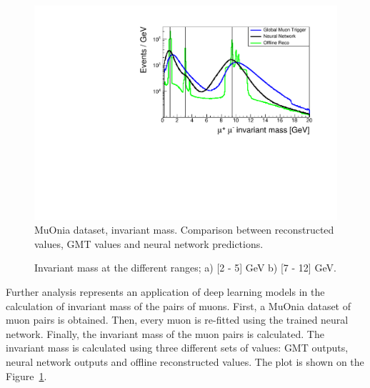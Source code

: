 \documentclass[10pt, paper=a4, UKenglish]{article}
\begin{document}
\begin{figure}[!htb]
    \centering
    \includegraphics[width=0.72\linewidth]{./images/inv_mass_total_lines_2.pdf}
    \caption{MuOnia dataset, invariant mass. Comparison between reconstructed values, GMT values and neural network predictions.}
    \label{fig:inv_mass}
\end{figure}

\begin{figure}[!htb]
  \centering
  \quad
  \caption{Invariant mass at the different ranges; a) [2 - 5] GeV b) [7 - 12] GeV.}
  \label{fig:inv_mass_ranges}
\end{figure}

Further analysis represents an application of deep learning models in the calculation of invariant mass of the pairs of muons. First, a MuOnia dataset of muon pairs is obtained. Then, every muon is re-fitted using the trained neural network. Finally, the invariant mass of the muon pairs is calculated. The invariant mass is calculated using three different sets of values: GMT outputs, neural network outputs and offline reconstructed values. The plot is shown on the Figure~\ref{fig:inv_mass}.
\end{document}
